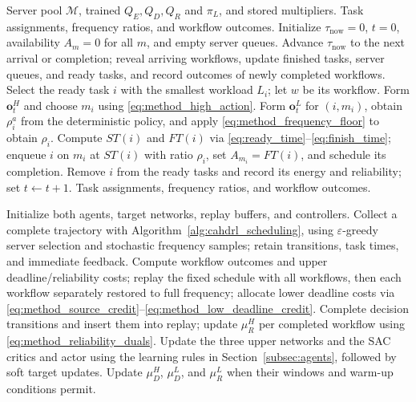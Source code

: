 \documentclass[journal]{IEEEtran}
\begin{document}
\begin{algorithm}[t]
\caption{Online workflow scheduling with CAHDRL}
\label{alg:cahdrl_scheduling}
\begin{algorithmic}[1]
\REQUIRE Server pool $\mathcal M$, trained $Q_E,Q_D,Q_R$ and $\pi_L$, and stored multipliers.
\ENSURE Task assignments, frequency ratios, and workflow outcomes.
\STATE Initialize $\tau_{\mathrm{now}}=0$, $t=0$, availability $A_m=0$ for all $m$, and empty server queues.
        \STATE Advance $\tau_{\mathrm{now}}$ to the next arrival or completion; reveal arriving workflows, update finished tasks, server queues, and ready tasks, and record outcomes of newly completed workflows.
    \ELSE
        \STATE Select the ready task $i$ with the smallest workload $L_i$; let $w$ be its workflow.
        \STATE Form $\boldsymbol o_t^H$ and choose $m_i$ using \eqref{eq:method_high_action}.
        \STATE Form $\boldsymbol o_t^L$ for $(i,m_i)$, obtain $\rho_i^a$ from the deterministic policy, and apply \eqref{eq:method_frequency_floor} to obtain $\rho_i$.
        \STATE Compute $ST(i)$ and $FT(i)$ via \eqref{eq:ready_time}--\eqref{eq:finish_time}; enqueue $i$ on $m_i$ at $ST(i)$ with ratio $\rho_i$, set $A_{m_i}=FT(i)$, and schedule its completion.
        \STATE Remove $i$ from the ready tasks and record its energy and reliability; set $t\leftarrow t+1$.
    \ENDIF
\ENDWHILE
\RETURN Task assignments, frequency ratios, and workflow outcomes.
\end{algorithmic}
\end{algorithm}

\begin{algorithm}[t]
\caption{Joint training of CAHDRL}
\label{alg:cahdrl_training}
\begin{algorithmic}[1]
\STATE Initialize both agents, target networks, replay buffers, and controllers.
    \STATE Collect a complete trajectory with Algorithm~\ref{alg:cahdrl_scheduling}, using $\varepsilon$-greedy server selection and stochastic frequency samples; retain transitions, task times, and immediate feedback.
    \STATE Compute workflow outcomes and upper deadline/reliability costs; replay the fixed schedule with all workflows, then each workflow separately restored to full frequency; allocate lower deadline costs via \eqref{eq:method_source_credit}--\eqref{eq:method_low_deadline_credit}.
    \STATE Complete decision transitions and insert them into replay; update $\mu_R^H$ per completed workflow using \eqref{eq:method_reliability_duals}.
    \STATE Update the three upper networks and the SAC critics and actor using the learning rules in Section~\ref{subsec:agents}, followed by soft target updates.
    \STATE Update $\mu_D^H$, $\mu_D^L$, and $\mu_R^L$ when their windows and warm-up conditions permit.
\ENDFOR
\end{algorithmic}
\end{algorithm}
\end{document}
